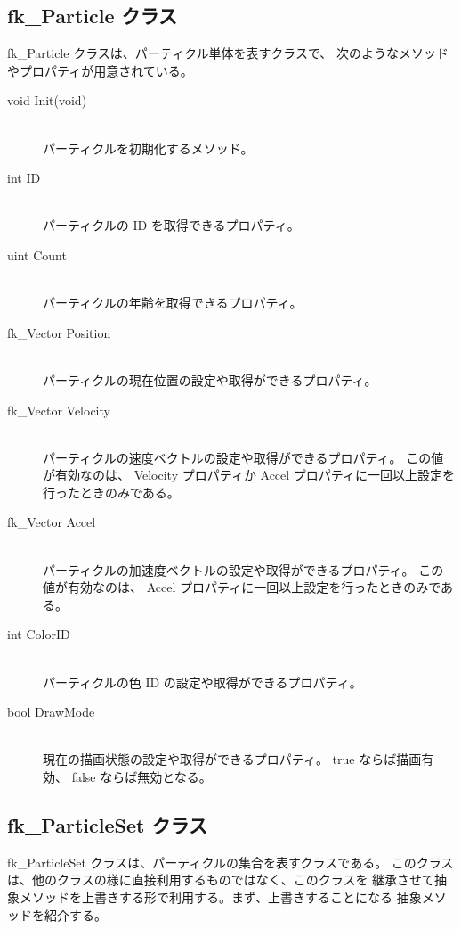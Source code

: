 \subsection{fk\_Particle クラス}
fk\_Particle クラスは、パーティクル単体を表すクラスで、
次のようなメソッドやプロパティが用意されている。
\begin{description}
\item[void Init(void)] ~ \\
	パーティクルを初期化するメソッド。\\

\item[int ID] ~ \\
	パーティクルの ID を取得できるプロパティ。\\

\item[uint Count] ~ \\
	パーティクルの年齢を取得できるプロパティ。\\

\item[fk\_Vector Position] ~ \\
	パーティクルの現在位置の設定や取得ができるプロパティ。\\

\item[fk\_Vector Velocity] ~ \\
	パーティクルの速度ベクトルの設定や取得ができるプロパティ。
	この値が有効なのは、
	Velocity プロパティか Accel プロパティに一回以上設定を行ったときのみである。\\

\item[fk\_Vector Accel] ~ \\
	パーティクルの加速度ベクトルの設定や取得ができるプロパティ。
	この値が有効なのは、
	Accel プロパティに一回以上設定を行ったときのみである。\\

\item[int ColorID] ~ \\
	パーティクルの色 ID の設定や取得ができるプロパティ。\\

\item[bool DrawMode] ~ \\
	現在の描画状態の設定や取得ができるプロパティ。
	true ならば描画有効、
	false ならば無効となる。
\end{description}

\subsection{fk\_ParticleSet クラス} 
fk\_ParticleSet クラスは、パーティクルの集合を表すクラスである。
このクラスは、他のクラスの様に直接利用するものではなく、このクラスを
継承させて抽象メソッドを上書きする形で利用する。まず、上書きすることになる
抽象メソッドを紹介する。
